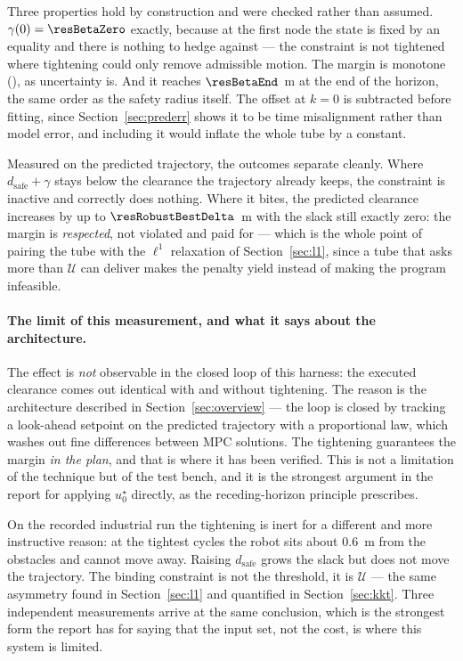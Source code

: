 \documentclass[11pt,a4paper]{article}
\newcommand{\dsafe}{d_{\mathrm{safe}}}
\begin{document}

Three properties hold by construction and were checked rather than assumed. $\gamma(0)=\resBetaZero$ exactly,
because at the first node the state is fixed by an equality and there is nothing to hedge against --- the
constraint is not tightened where tightening could only remove admissible motion. The margin is monotone
(\resBetaMonotone), as uncertainty is. And it reaches $\resBetaEnd$~m at the end of the horizon, the same
order as the safety radius itself. The offset at $k=0$ is subtracted before fitting, since
Section~\ref{sec:prederr} shows it to be time misalignment rather than model error, and including it would
inflate the whole tube by a constant.


Measured on the predicted trajectory, the outcomes separate cleanly. Where $\dsafe+\gamma$ stays below the
clearance the trajectory already keeps, the constraint is inactive and correctly does nothing. Where it
bites, the predicted clearance increases by up to $\resRobustBestDelta$~m with the slack still exactly zero:
the margin is \emph{respected}, not violated and paid for --- which is the whole point of pairing the tube
with the $\ell^1$ relaxation of Section~\ref{sec:l1}, since a tube that asks more than $\mathcal{U}$ can
deliver makes the penalty yield instead of making the program infeasible.

\paragraph{The limit of this measurement, and what it says about the architecture.} The effect is
\emph{not} observable in the closed loop of this harness: the executed clearance comes out identical with and
without tightening. The reason is the architecture described in Section~\ref{sec:overview} --- the loop is
closed by tracking a look-ahead setpoint on the predicted trajectory with a proportional law, which washes
out fine differences between MPC solutions. The tightening guarantees the margin \emph{in the plan}, and that
is where it has been verified. This is not a limitation of the technique but of the test bench, and it is the
strongest argument in the report for applying $u^\star_0$ directly, as the receding-horizon principle
prescribes.

On the recorded industrial run the tightening is inert for a different and more instructive reason: at the
tightest cycles the robot sits about $0.6$~m from the obstacles and cannot move away. Raising $\dsafe$ grows
the slack but does not move the trajectory. The binding constraint is not the threshold, it is
$\mathcal{U}$ --- the same asymmetry found in Section~\ref{sec:l1} and quantified in Section~\ref{sec:kkt}.
Three independent measurements arrive at the same conclusion, which is the strongest form the report has for
saying that the input set, not the cost, is where this system is limited.
\end{document}
